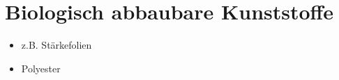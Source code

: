 \section{Biologisch abbaubare Kunststoffe}
\begin{itemize}
    \item z.B. Stärkefolien
    \item Polyester
\end{itemize}
